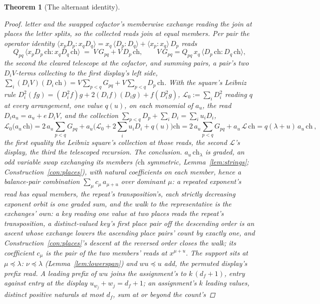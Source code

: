 \documentclass[11pt]{article}
\newtheorem{theorem}{Theorem}
\theoremstyle{definition}
\begin{document}
\begin{theorem}[The alternant identity]
\begin{proof}
letter and the swapped cofactor's memberwise exchange reading the
join at places the letter splits, so the collected reads join at
equal members. Per pair the operator
identity
$\langle x_pD_p\!:\!x_qD_q\rangle
=x_q\,\langle D_p\!:\!D_q\rangle+\langle x_p\!:\!x_q\rangle\,D_p$
reads
\[
Q_{pq}\,\big\langle x_pD_p\,\mathrm{ch}\!:\!x_qD_q\,\mathrm{ch}\big\rangle
\;=\;V\,G_{pq}+V\,D_p\,\mathrm{ch} ,
\qquad
V\,G_{pq}=Q_{pq}\,x_q\,
\big\langle D_p\,\mathrm{ch}\!:\!D_q\,\mathrm{ch}\big\rangle ,
\]
the second the cleared telescope at the cofactor, and summing pairs,
a pair's two $D_iV$-terms collecting to the first display's
left side,
$\sum_i(D_iV)(D_i\,\mathrm{ch})
=V\sum_{p<q}G_{pq}+V\sum_{p<q}D_p\,\mathrm{ch}$. With the square's
Leibniz rule $D_i^2(fg)=(D_i^2f)g+2(D_if)(D_ig)+f(D_i^2g)$,
$\mathcal L_0:=\sum_iD_i^2$ reading $q$ at every arrangement, one
value $q(u)$, on each monomial of $a_u$, the read
$D_ia_u=a_u+e\,D_iV$, and the collection
$\sum_{p<q}D_p+\sum_iD_i=\sum_iu_iD_i$,
\[
\mathcal L_0\big(a_u\,\mathrm{ch}\big)
=2\,a_u\!\sum_{p<q}\!G_{pq}
+a_u\Big(\mathcal L_0+2\sum_iu_iD_i+q(u)\Big)\mathrm{ch}
=2\,a_u\!\sum_{p<q}\!G_{pq}
+a_u\,\mathcal L\,\mathrm{ch}
=q(\lambda{+}u)\,a_u\,\mathrm{ch}\ ,
\]
the first equality the Leibniz square's collection at those reads,
the second $\mathcal L$'s display, the third the telescoped
recursion.
\emph{The conclusion.} $a_u\,\mathrm{ch}_\lambda$ is graded, an odd
variable swap exchanging its members
($\mathrm{ch}$ symmetric, Lemma~\ref{lem:strings};
Construction~\ref{con:places}), with natural coefficients on each
member, hence a balance-pair combination
$\sum_\mu c_\mu\,a_{\mu+u}$ over dominant $\mu$: a repeated
exponent's read has equal members, the repeat's transposition's,
each strictly
decreasing exponent orbit is one graded sum, and the walk to the
representative is the exchanges' own: a key reading one value at
two places reads the repeat's transposition, a distinct-valued
key's first place pair off the descending order is an ascent
whose exchange lowers the ascending place pairs' count by exactly
one, and Construction~\ref{con:places}'s descent at the reversed
order closes the walk; its coefficient
$c_\mu$ is the pair of the two members' reads at $x^{\mu+u}$.
The support sits at $\mu\preceq\lambda$: $\nu\preceq\lambda$
(Lemma~\ref{lem:lowerspan}) and $wu\preceq u$ add, the permuted
display's prefix read. A leading prefix of $wu$ joins the
assignment's to $k\,(d_f{+}1)$, entry against entry at the display
$u_{w_j}+w_j=d_f+1$; an assignment's $k$ leading values, distinct
positive naturals at most $d_f$, sum at or beyond the count's

\end{proof}
\end{theorem}
\end{document}
